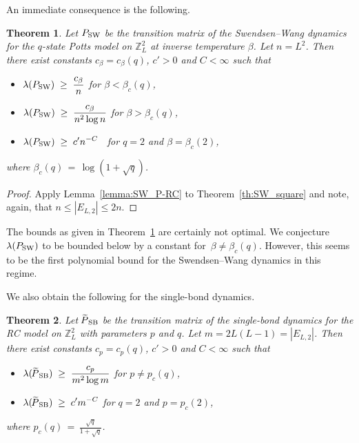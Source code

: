 \documentclass{dis}
\newtheorem{theorem}{Theorem}[chapter]
\theoremstyle{citing}
\begin{document}
An immediate consequence is the following.

\begin{theorem} \label{th:SW_square2}
Let ${P_{\rm SW}}$ be the transition matrix of the 
Swendsen--Wang dynamics for the $q$-state Potts model 
on ${\ensuremath{\mathbb{Z}}}^2_L$ at inverse temperature $\beta$. Let $n=L^2$. 
Then there exist constants $c_\beta=c_\beta(q)$, $c'>0$ and $C<\infty$ 
such that 
\begin{itemize}
\item\quad $\displaystyle \lambda({P_{\rm SW}}) \;\ge\; \frac{c_\beta}{n}$ 
			\qquad\qquad\quad for $\beta < \beta_c(q)$, \vspace{1mm}
\item\quad $\displaystyle \lambda({P_{\rm SW}}) \;\ge\; \frac{c_\beta}{n^2 \log n}$ 
			\qquad\; for $\beta > \beta_c(q)$, \vspace{1mm}
\item\quad $\displaystyle \lambda({P_{\rm SW}}) \;\ge\; c' n^{-C}$ 
			\qquad\quad\, for $q=2$ and $\beta = \beta_c(2)$,
\end{itemize}
where $\beta_c(q)\,=\,\log(1+\sqrt{q})$.
\end{theorem}
\vspace{2mm}

\begin{proof}
Apply Lemma~\ref{lemma:SW_P-RC} to Theorem~\ref{th:SW_square} 
and note, again, that 
$n\le{\left\vert {E_{L,2}} \right\vert}\le2n$.
\end{proof}
\vspace{1mm}

The bounds as given in Theorem~\ref{th:SW_square2} are 
certainly not optimal. 
We conjecture $\lambda({P_{\rm SW}})$ to be bounded below by a 
constant for~$\beta\neq\beta_c(q)$.
However, this seems to be the first polynomial bound for the 
Swendsen--Wang dynamics in this regime.

We also obtain the following for the single-bond dynamics. 

\vspace{1mm}

\begin{theorem} \label{th:SB_2d}
Let ${{\raisebox{2pt}{ ${\widetilde{{}}}$ }\mkern-14mu P}_{\rm SB}}$ be the transition matrix of the 
single-bond dynamics for the RC model 
on ${\ensuremath{\mathbb{Z}}}^2_L$ with parameters $p$ and $q$. Let $m=2L(L-1)={\left\vert {E_{L,2}} \right\vert}$. 
Then there exist constants $c_p=c_p(q)$, $c'>0$ and $C<\infty$ such that 
\begin{itemize}
\item\quad $\displaystyle \lambda({{\raisebox{2pt}{ ${\widetilde{{}}}$ }\mkern-14mu P}_{\rm SB}}) \;\ge\; \frac{c_p}{m^2 \log m}$ 
			\qquad for $p \neq p_c(q)$, \vspace{2mm}
\item\quad $\displaystyle \lambda({{\raisebox{2pt}{ ${\widetilde{{}}}$ }\mkern-14mu P}_{\rm SB}}) \;\ge\; c' m^{-C}$ 
			\qquad\quad for $q=2$ and $p = p_c(2)$,
\end{itemize}
where $p_c(q)\,=\,\frac{\sqrt{q}}{1+\sqrt{q}}$.
\end{theorem}
\end{document}
